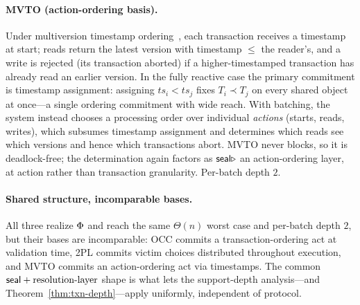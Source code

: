 \paragraph{MVTO (action-ordering basis).}
Under multiversion timestamp ordering~\cite{reed1978naming}, each transaction
receives a timestamp at start; reads return the latest version with timestamp
$\le$ the reader's, and a write is rejected (its transaction aborted) if a
higher-timestamped transaction has already read an earlier version. In the fully
reactive case the primary commitment is timestamp assignment: assigning
$ts_i < ts_j$ fixes $T_i \prec T_j$ on every shared object at once---a single
ordering commitment with wide reach. With batching, the system instead chooses a
processing order over individual \emph{actions} (starts, reads, writes), which
subsumes timestamp assignment and determines which reads see which versions and
hence which transactions abort. MVTO never blocks, so it is deadlock-free; the
determination again factors as $\mathsf{seal} \mathbin{\triangleright}$ an action-ordering layer, at action
rather than transaction granularity. Per-batch depth $2$.

\paragraph{Shared structure, incomparable bases.}
All three realize $\Phi$ and reach the same $\Theta(n)$ worst case and
per-batch depth $2$, but their bases are incomparable: OCC commits a
transaction-ordering act at validation time, 2PL commits victim choices
distributed throughout execution, and MVTO commits an action-ordering act via
timestamps. The common $\mathsf{seal} + \text{resolution-layer}$ shape is what lets the
support-depth analysis---and Theorem~\ref{thm:txn-depth}---apply uniformly,
independent of protocol.
